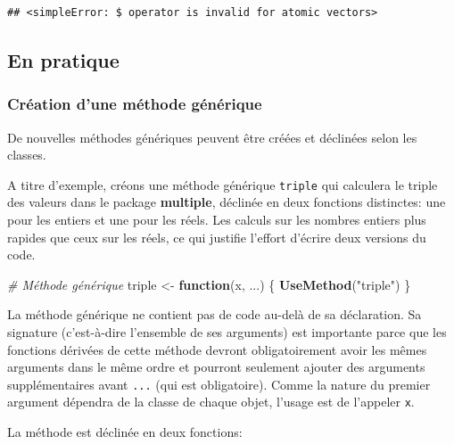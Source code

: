 \documentclass[
  12pt,
  french,
  a4paper,
  extrafontsizes,onecolumn,openright
  ]{memoir}
\newenvironment{Shaded}{\begin{snugshade}}{\end{snugshade}}
\newcommand{\CommentTok}[1]{\textcolor[rgb]{0.56,0.35,0.01}{\textit{#1}}}
\newcommand{\ControlFlowTok}[1]{\textcolor[rgb]{0.13,0.29,0.53}{\textbf{#1}}}
\newcommand{\KeywordTok}[1]{\textcolor[rgb]{0.13,0.29,0.53}{\textbf{#1}}}
\newcommand{\NormalTok}[1]{#1}
\newcommand{\StringTok}[1]{\textcolor[rgb]{0.31,0.60,0.02}{#1}}
\begin{document}
\begin{verbatim}
## <simpleError: $ operator is invalid for atomic vectors>
\end{verbatim}

\normalsize

\hypertarget{en-pratique}{%
\subsection{En pratique}\label{en-pratique}}

\hypertarget{cruxe9ation-dune-muxe9thode-guxe9nuxe9rique}{%
\subsubsection{Création d'une méthode générique}\label{cruxe9ation-dune-muxe9thode-guxe9nuxe9rique}}

De nouvelles méthodes génériques peuvent être créées et déclinées selon les classes.

A titre d'exemple, créons une méthode générique \texttt{triple} qui calculera le triple des valeurs dans le package \textbf{multiple}, déclinée en deux fonctions distinctes: une pour les entiers et une pour les réels.
Les calculs sur les nombres entiers plus rapides que ceux sur les réels, ce qui justifie l'effort d'écrire deux versions du code.

\scriptsize

\begin{Shaded}
\begin{Highlighting}[]
\CommentTok{# Méthode générique}
\NormalTok{triple <-}\StringTok{ }\ControlFlowTok{function}\NormalTok{(x, ...) \{}
    \KeywordTok{UseMethod}\NormalTok{(}\StringTok{"triple"}\NormalTok{)}
\NormalTok{\}}
\end{Highlighting}
\end{Shaded}

\normalsize

La méthode générique ne contient pas de code au-delà de sa déclaration.
Sa signature (c'est-à-dire l'ensemble de ses arguments) est importante parce que les fonctions dérivées de cette méthode devront obligatoirement avoir les mêmes arguments dans le même ordre et pourront seulement ajouter des arguments supplémentaires avant \texttt{...} (qui est obligatoire).
Comme la nature du premier argument dépendra de la classe de chaque objet, l'usage est de l'appeler \texttt{x}.

La méthode est déclinée en deux fonctions:

\scriptsize
\end{document}
